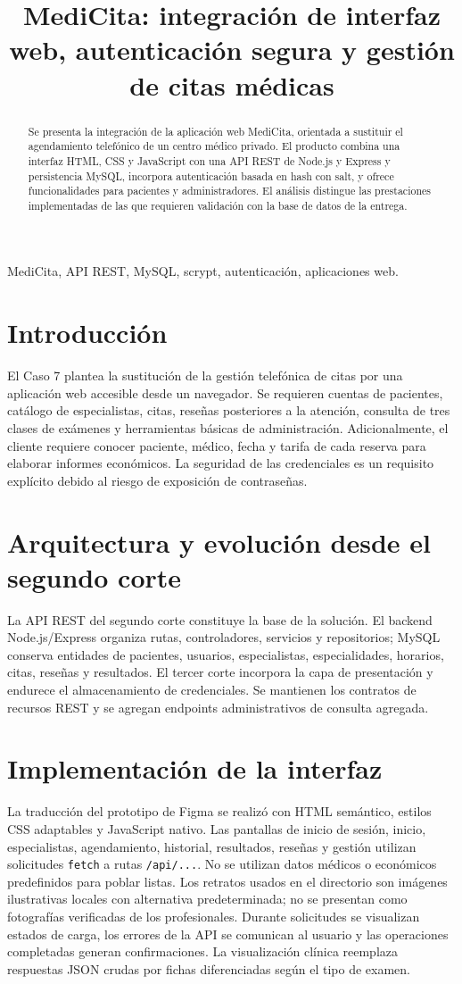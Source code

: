 \documentclass[conference]{IEEEtran}
\title{MediCita: integración de interfaz web, autenticación segura y gestión de citas médicas}
\author{\IEEEauthorblockN{[Integrantes del equipo]}\IEEEauthorblockA{[Universidad]\\[Curso y docente]}}
\begin{document}
\maketitle
\begin{abstract}
Se presenta la integración de la aplicación web MediCita, orientada a sustituir el agendamiento telefónico de un centro médico privado. El producto combina una interfaz HTML, CSS y JavaScript con una API REST de Node.js y Express y persistencia MySQL, incorpora autenticación basada en hash con salt, y ofrece funcionalidades para pacientes y administradores. El análisis distingue las prestaciones implementadas de las que requieren validación con la base de datos de la entrega.
\end{abstract}
\begin{IEEEkeywords}
MediCita, API REST, MySQL, scrypt, autenticación, aplicaciones web.
\end{IEEEkeywords}
\section{Introducción}
El Caso 7 plantea la sustitución de la gestión telefónica de citas por una aplicación web accesible desde un navegador. Se requieren cuentas de pacientes, catálogo de especialistas, citas, reseñas posteriores a la atención, consulta de tres clases de exámenes y herramientas básicas de administración. Adicionalmente, el cliente requiere conocer paciente, médico, fecha y tarifa de cada reserva para elaborar informes económicos. La seguridad de las credenciales es un requisito explícito debido al riesgo de exposición de contraseñas.
\section{Arquitectura y evolución desde el segundo corte}
La API REST del segundo corte constituye la base de la solución. El backend Node.js/Express organiza rutas, controladores, servicios y repositorios; MySQL conserva entidades de pacientes, usuarios, especialistas, especialidades, horarios, citas, reseñas y resultados. El tercer corte incorpora la capa de presentación y endurece el almacenamiento de credenciales. Se mantienen los contratos de recursos REST y se agregan endpoints administrativos de consulta agregada.
\section{Implementación de la interfaz}
La traducción del prototipo de Figma se realizó con HTML semántico, estilos CSS adaptables y JavaScript nativo. Las pantallas de inicio de sesión, inicio, especialistas, agendamiento, historial, resultados, reseñas y gestión utilizan solicitudes \texttt{fetch} a rutas \texttt{/api/...}. No se utilizan datos médicos o económicos predefinidos para poblar listas. Los retratos usados en el directorio son imágenes ilustrativas locales con alternativa predeterminada; no se presentan como fotografías verificadas de los profesionales. Durante solicitudes se visualizan estados de carga, los errores de la API se comunican al usuario y las operaciones completadas generan confirmaciones. La visualización clínica reemplaza respuestas JSON crudas por fichas diferenciadas según el tipo de examen.
\end{document}

